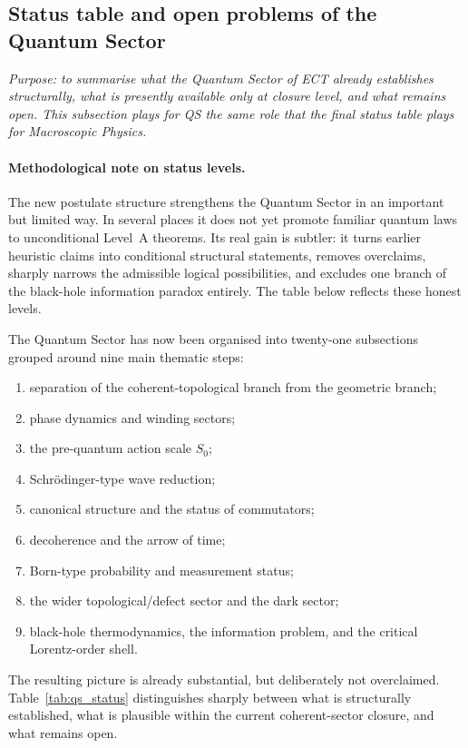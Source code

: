 \subsection{Status table and open problems of the Quantum Sector}
\label{sec:qs_status}

\textit{Purpose: to summarise what the Quantum Sector of ECT already
establishes structurally, what is presently available only at closure
level, and what remains open.
This subsection plays for QS the same role that the final status table
plays for Macroscopic Physics.}

\medskip
\paragraph{Methodological note on status levels.}
The new postulate structure strengthens the Quantum Sector in an
important but limited way.
In several places it does not yet promote familiar quantum laws
to unconditional Level~A theorems.
Its real gain is subtler: it turns earlier heuristic claims into
conditional structural statements, removes overclaims, sharply
narrows the admissible logical possibilities, and excludes one
branch of the black-hole information paradox entirely.
The table below reflects these honest levels.

\medskip
The Quantum Sector has now been organised into twenty-one subsections
grouped around nine main thematic steps:
\begin{enumerate}[noitemsep,label=(\roman*)]
  \item separation of the coherent-topological branch from the
    geometric branch;
  \item phase dynamics and winding sectors;
  \item the pre-quantum action scale $S_0$;
  \item Schr\"odinger-type wave reduction;
  \item canonical structure and the status of commutators;
  \item decoherence and the arrow of time;
  \item Born-type probability and measurement status;
  \item the wider topological/defect sector and the dark sector;
  \item black-hole thermodynamics, the information problem, and
    the critical Lorentz-order shell.
\end{enumerate}
The resulting picture is already substantial, but deliberately not
overclaimed.
Table~\ref{tab:qs_status} distinguishes sharply between what is
structurally established, what is plausible within the current
coherent-sector closure, and what remains open.

